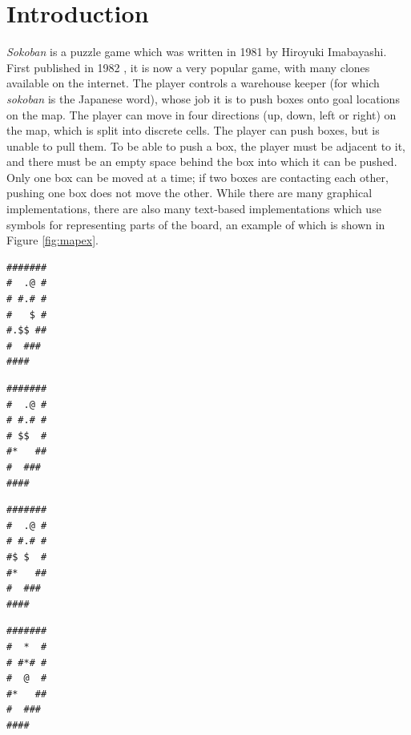 \documentclass[a4paper,11pt]{article}
\begin{document}
\section{Introduction}
\emph{Sokoban} is a puzzle game which was written in 1981 by Hiroyuki
Imabayashi. First published in 1982 \cite{sokoban}, it is now a very popular
game, with many clones available on the internet. The player controls a
warehouse keeper (for which \emph{sokoban} is the Japanese word), whose job it
is to push boxes onto goal locations on the map. The player can move in four
directions (up, down, left or right) on the map, which is split into discrete
cells. The player can push boxes, but is unable to pull them. To be able to push
a box, the player must be adjacent to it, and there must be an empty space
behind the box into which it can be pushed. Only one box can be moved at a time;
if two boxes are contacting each other, pushing one box does not move the
other. While there are many graphical implementations, there are also many
text-based implementations which use symbols for representing parts of the
board, an example of which is shown in Figure \ref{fig:mapex}.

\begin{lrbox}{\boxone}
  \begin{minipage}{.25\textwidth}
\centering
\begin{BVerbatim}
#######
#  .@ #
# #.# #
#   $ #
#.$$ ##
#  ###
####
\end{BVerbatim}
  \end{minipage}
\end{lrbox}%

\begin{lrbox}{\boxtwo}
  \begin{minipage}{.25\textwidth}
\centering
\begin{BVerbatim}
#######
#  .@ #
# #.# #
# $$  #
#*   ##
#  ###
####
\end{BVerbatim}
  \end{minipage}
\end{lrbox}%

\begin{lrbox}{\boxthree}
  \begin{minipage}{.25\textwidth}
\centering
\begin{BVerbatim}
#######
#  .@ #
# #.# #
#$ $  #
#*   ##
#  ###
####
\end{BVerbatim}
  \end{minipage}
\end{lrbox}%

\begin{lrbox}{\boxfour}
  \begin{minipage}{.25\textwidth}
\centering
\begin{BVerbatim}
#######
#  *  #
# #*# #
#  @  #
#*   ##
#  ###
####
\end{BVerbatim}
  \end{minipage}
\end{lrbox}%
\end{document}

